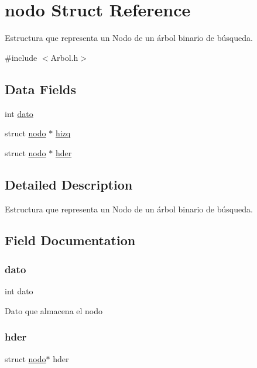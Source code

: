 \hypertarget{structnodo}{}\section{nodo Struct Reference}
\label{structnodo}


Estructura que representa un Nodo de un árbol binario de búsqueda.  




{\ttfamily \#include $<$Arbol.\+h$>$}

\subsection*{Data Fields}
\begin{DoxyCompactItemize}
\item 
int \mbox{\hyperlink{structnodo_a33e295a1bffa3a6eda0ba9ec8ef077bb}{dato}}
\item 
struct \mbox{\hyperlink{structnodo}{nodo}} $\ast$ \mbox{\hyperlink{structnodo_aa55874eca5bf114bf94e1d5d622bdd42}{hizq}}
\item 
struct \mbox{\hyperlink{structnodo}{nodo}} $\ast$ \mbox{\hyperlink{structnodo_aef5977872bfdf69195dd8782d0cf89c1}{hder}}
\end{DoxyCompactItemize}


\subsection{Detailed Description}
Estructura que representa un Nodo de un árbol binario de búsqueda. 

\subsection{Field Documentation}
\mbox{\label{structnodo_a33e295a1bffa3a6eda0ba9ec8ef077bb}} 
\subsubsection{\texorpdfstring{dato}{dato}}
{\footnotesize\ttfamily int dato}

Dato que almacena el nodo \mbox{\label{structnodo_aef5977872bfdf69195dd8782d0cf89c1}} 
\subsubsection{\texorpdfstring{hder}{hder}}
{\footnotesize\ttfamily struct \mbox{\hyperlink{structnodo}{nodo}}$\ast$ hder}

